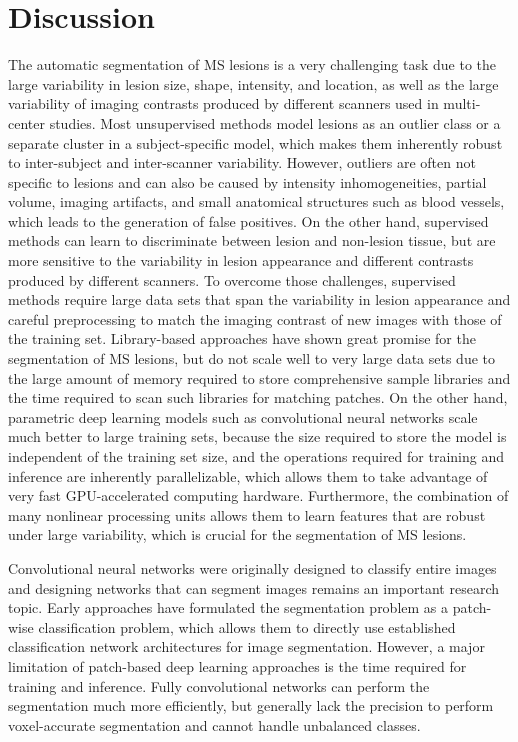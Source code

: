 \section{Discussion}

The automatic segmentation of MS lesions is a very challenging task due to the
large variability in lesion size, shape, intensity, and location, as well as the
large variability of imaging contrasts produced by different scanners used in
multi-center studies. Most unsupervised methods model lesions as an outlier
class or a separate cluster in a subject-specific model, which makes them
inherently robust to inter-subject and inter-scanner variability. However,
outliers are often not specific to lesions and can also be caused by intensity
inhomogeneities, partial volume, imaging artifacts, and small anatomical
structures such as blood vessels, which leads to the generation of false
positives. On the other hand, supervised methods can learn to discriminate
between lesion and non-lesion tissue, but are more sensitive to the variability
in lesion appearance and different contrasts produced by different scanners. To
overcome those challenges, supervised methods require large data sets that span
the variability in lesion appearance and careful preprocessing to match the
imaging contrast of new images with those of the training set. Library-based
approaches have shown great promise for the segmentation of MS lesions, but do
not scale well to very large data sets due to the large amount of memory
required to store comprehensive sample libraries and the time required to scan
such libraries for matching patches. On the other hand, parametric deep learning
models such as convolutional neural networks scale much better to large training
sets, because the size required to store the model is independent of the
training set size, and the operations required for training and inference are
inherently parallelizable, which allows them to take advantage of very fast
GPU-accelerated computing hardware. Furthermore, the combination of many
nonlinear processing units allows them to learn features that are robust under
large variability, which is crucial for the segmentation of MS lesions.

Convolutional neural networks were originally designed to classify entire images
and designing networks that can segment images remains an important research
topic. Early approaches have formulated the segmentation problem as a patch-wise
classification problem, which allows them to directly use established
classification network architectures for image segmentation.
However, a major limitation of patch-based deep learning approaches is the time
required for training and inference. Fully convolutional networks can perform
the segmentation much more efficiently, but generally lack the precision to
perform voxel-accurate segmentation and cannot handle unbalanced classes.

